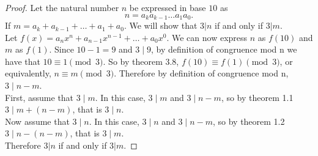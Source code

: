 \documentclass[12pt,leqno]{article}
\numberwithin{equation}{section}
\theoremstyle{definition}
\begin{document}
\begin{proof}[Proof]
Let the natural number $n$ be expressed in base $10$ as
\[n = a_k a_{k-1} \hdots a_1 a_0. \]
If $m = a_k + a_{k-1} + \hdots + a_1 + a_0$. We will show that $3|n$ if and only if $3|m$.\\

Let $f(x) = a_nx^n + a_{n-1}x^{n-1} + \hdots + a_0x^0$.  We can now express $n$ as $f(10)$ and $m$ as $f(1)$.  Since $10 - 1 = 9$ and $3 \mid 9$, by definition of congruence mod n we have that $10 \equiv 1 \pmod{3}$.  So by theorem 3.8, $f(10) \equiv f(1) \pmod{3}$, or equivalently, $n \equiv m \pmod{3}$.  Therefore by definition of congruence mod n, $3 \mid n - m$.\\

First, assume that $3 \mid m$.  In this case, $3 \mid m$ and $3 \mid n-m$, so by theorem 1.1 $3 \mid m + (n-m)$, that is $3\mid n$.\\

Now assume that $3 \mid n$.  In this case, $3 \mid n$ and $3 \mid n-m$, so by theorem 1.2 $3 \mid n - (n-m)$, that is $3\mid m$.\\

Therefore $3|n$ if and only if $3|m$.
\end{proof}
\end{document}

